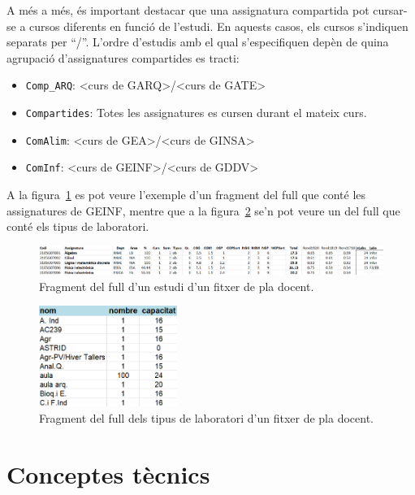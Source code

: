 \documentclass[a4paper,12pt]{ThesisStyle}
\begin{document}
A més a més, és important destacar que una assignatura compartida pot cursar-se a cursos diferents en funció de l'estudi. En aquests casos, els cursos s'indiquen separats per ``/''. L'ordre d'estudis amb el qual s'especifiquen depèn de quina agrupació d'assignatures compartides es tracti:
\begin{itemize}
  \item \texttt{Comp\_ARQ}: <curs de GARQ>/<curs de GATE>
  \item \texttt{Compartides}: Totes les assignatures es cursen durant el mateix curs.
  \item \texttt{ComAlim}: <curs de GEA>/<curs de GINSA>
  \item \texttt{ComInf}: <curs de GEINF>/<curs de GDDV>
\end{itemize}

A la figura~\ref{img:frag_pla_docent} es pot veure l'exemple d'un fragment del full que conté les assignatures de GEINF, mentre que a la figura~\ref{img:frag_pla_docent_labs} se'n pot veure un del full que conté els tipus de laboratori.

\begin{figure}[H]
  \centering
  \includegraphics[width=\textwidth]{assets/figs/fitxerPlaDocent.png}
  \caption{\label{img:frag_pla_docent}Fragment del full d'un estudi d'un fitxer de pla docent.}
\end{figure}

\begin{figure}[H]
  \centering
  \includegraphics[width=0.4\textwidth]{assets/figs/fitxerPlaDocentLabs.png}
  \caption{\label{img:frag_pla_docent_labs}Fragment del full dels tipus de laboratori d'un fitxer de pla docent.}
\end{figure}


\section{Conceptes tècnics}
\label{sec:conceptes_tecnics}
\end{document}
